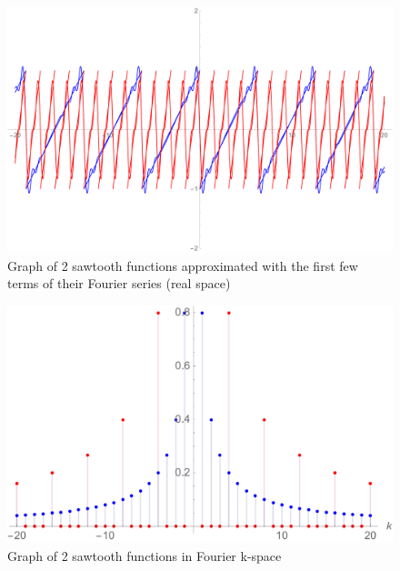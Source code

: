 \documentclass[a4paper,12pt]{article}
\begin{document}
\begin{figure}[H]
  \centering
  \includegraphics[width=140mm, scale=0.5]{images/sawtooth-comparison-real-space.pdf}
  \caption{Graph of 2 sawtooth functions approximated with the first few terms of their Fourier series (real space)}
  \label{Sawtooth-comparison-real-space}
\end{figure}


\begin{figure}[H]
  \centering
  \includegraphics[width=140mm, scale=0.5]{images/sawtooth-comparison-k-space.pdf}
  \caption{Graph of 2 sawtooth functions in Fourier k-space}
  \label{Sawtooth-comparison-k-space}
\end{figure}
\end{document}
